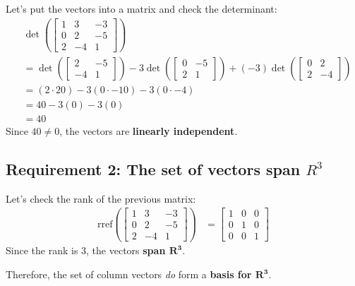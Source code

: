 \documentclass[
  letterpaper,
  DIV=11,
  numbers=noendperiod]{scrartcl}
\begin{document}
Let's put the vectors into a matrix and check the determinant:
\begin{align*}
&\det\left(\begin{bmatrix}1 & 3 & -3 \\ 0 & 2 & -5 \\ 2 & -4 & 1 \end{bmatrix}\right) \\
&= \det\left(\begin{bmatrix}2 & -5 \\ -4 & 1\end{bmatrix}\right)-3\det\left(\begin{bmatrix}0 & -5 \\ 2 & 1\end{bmatrix}\right) + (-3)\det\left(\begin{bmatrix}0 & 2 \\ 2 & -4\end{bmatrix}\right) \\
&= (2\cdot 20)-3(0\cdot -10)-3(0\cdot -4) \\
&= 40-3(0)-3(0) \\
&= 40 
\end{align*} Since \(40 \ne 0\), the vectors are \textbf{linearly
independent}.

\hypertarget{requirement-2-the-set-of-vectors-span-r3}{%
\subsection{\texorpdfstring{Requirement 2: The set of vectors span
\(R^3\)}{Requirement 2: The set of vectors span R\^{}3}}\label{requirement-2-the-set-of-vectors-span-r3}}

Let's check the rank of the previous matrix: \begin{align*}
\mathrm{rref}\left(\begin{bmatrix}1 & 3 & -3 \\ 0 & 2 & -5 \\ 2 & -4 & 1 \end{bmatrix}\right) &= \begin{bmatrix}1 & 0 & 0 \\ 0 & 1 & 0 \\ 0 & 0 & 1 \end{bmatrix}
\end{align*} Since the rank is 3, the vectors \textbf{span
\(\symbf{R^3}\)}.

Therefore, the set of column vectors \emph{do} form a \textbf{basis for
\(\symbf{R^3}\)}.
\end{document}
